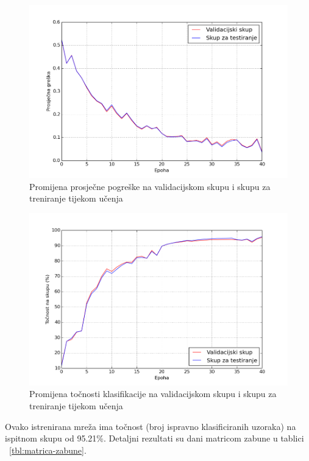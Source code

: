 \documentclass[times, utf8, zavrsni, numeric]{fer}
\begin{document}
\begin{figure}[h]
    \centering
    \includegraphics[width=14cm]{img/graf-greska.png}
    \caption{Promijena prosječne pogreške na validacijskom skupu i skupu za treniranje tijekom učenja}
    \label{fig:graf-greska}
\end{figure}

\begin{figure}[h]	
    \centering
    \includegraphics[width=14cm]{img/graf-tocnost.png}
    \caption{Promijena točnosti klasifikacije na validacijskom skupu i skupu za treniranje tijekom učenja}
    \label{fig:graf-tocnost}
\end{figure}








Ovako istrenirana mreža ima točnost (broj ispravno klasificiranih uzoraka) na ispitnom skupu od 95.21\%. Detaljni rezultati su dani matricom zabune u tablici ~\ref{tbl:matrica-zabune}.
 
\end{document}
